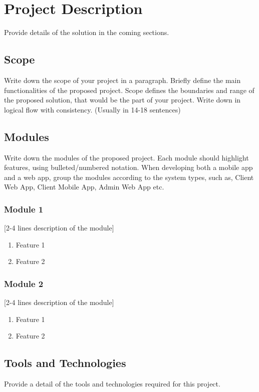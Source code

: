 \chapter{Project Description}
\label{ch:description}

Provide details of the solution in the coming sections.

\section{Scope}
Write down the scope of your project in a paragraph. Briefly define the main functionalities of the proposed project. Scope defines the boundaries and range of the proposed solution, that would be the part of your project. Write down in logical flow with consistency. 
(Usually in 14-18 sentences)

\section{Modules}
Write down the modules of the proposed project.   
Each module should highlight features, using bulleted/numbered notation. 
When developing both a mobile app and a web app, group the modules according to the system types, such as, Client Web App, Client Mobile App, Admin Web App etc.

\subsection{Module 1}
[2-4 lines description of the module]
\begin{enumerate}
    \item Feature 1
    \item Feature 2
\end{enumerate}

\subsection{Module 2}
[2-4 lines description of the module]
\begin{enumerate}
    \item Feature 1
    \item Feature 2
\end{enumerate}


\section{Tools and Technologies}
Provide a detail of the tools and technologies required for this project.

